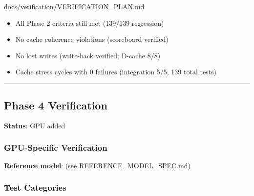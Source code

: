 \begin{relocated}{docs/verification/VERIFICATION_PLAN.md}
\begin{itemize}
\tightlist
\item
  \ok{} All Phase 2 criteria still met (139/139 regression)
\item
  \ok{} No cache coherence violations (scoreboard verified)
\item
  \ok{} No lost writes (write-back verified; D-cache 8/8)
\item
  \ok{} Cache stress cycles with 0 failures (integration 5/5, 139 total
  tests)
\end{itemize}

\begin{center}\rule{0.5\linewidth}{0.5pt}\end{center}

\subsection{Phase 4 Verification}\label{ds:ch:verification-plan:phase-4-verification}

\textbf{Status}: GPU added

\subsubsection{GPU-Specific Verification}\label{ds:ch:verification-plan:gpu-specific-verification}

\textbf{Reference model}:  (see
REFERENCE\_\allowbreak{}MODEL\_\allowbreak{}SPEC.md)

\subsubsection{Test Categories}\label{ds:ch:verification-plan:test-categories-1}


\end{relocated}
